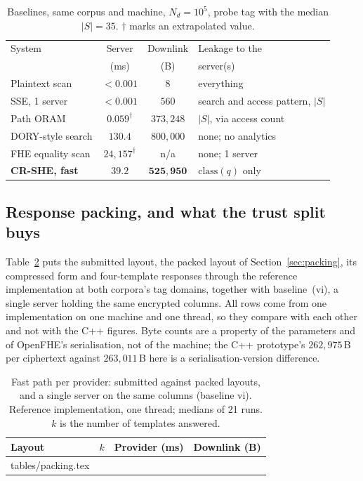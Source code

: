 \documentclass[a4paper,fleqn]{cas-dc}
\begin{document}
\begin{table}[pos=t]
\caption{Baselines, same corpus and machine, $N_d=10^5$, probe tag with the
median $|S|=35$. $\dagger$ marks an extrapolated value.}
\label{tab:baselines}
\centering
\footnotesize
\setlength{\tabcolsep}{3pt}
\renewcommand{\arraystretch}{1.2}
\begin{tabular}{@{}lcc>{\raggedright\arraybackslash}p{2.1cm}@{}}
\toprule
System & Server & Downlink & Leakage to the \\
       & (ms)   & (B)      & server(s) \\
\midrule
Plaintext scan        & $<0.001$ & $8$              & everything \\
SSE, 1 server         & $<0.001$ & $560$            & search and access
pattern, $|S|$ \\
Path ORAM             & $0.059^{\dagger}$ & $373{,}248$ & $|S|$, via access
count \\
DORY-style search     & $130.4$  & $800{,}000$      & none; no analytics \\
FHE equality scan     & $24{,}157^{\dagger}$ & n/a & none; 1 server \\
\midrule
\textbf{CR-SHE, fast} & $\mathbf{39.2}$ & $\mathbf{525{,}950}$ &
$\mathrm{class}(q)$ only \\
\bottomrule
\end{tabular}
\end{table}

\subsection{Response packing, and what the trust split buys}
\label{sec:packresult}
Table~\ref{tab:packing} puts the submitted layout, the packed layout of
Section~\ref{sec:packing}, its compressed form and four-template responses
through the reference implementation at both corpora's tag domains, together
with baseline~(vi), a single server holding the same encrypted columns. All
rows come from one implementation on one machine and one thread, so they
compare with each other and not with the C++ figures. Byte counts are a
property of the parameters and of OpenFHE's serialisation, not of the
machine; the C++ prototype's $262{,}975$\,B per ciphertext against
$263{,}011$\,B here is a serialisation-version difference.

\begin{table}[pos=t]
\caption{Fast path per provider: submitted against packed layouts, and a
single server on the same columns (baseline vi). Reference implementation,
one thread; medians of 21 runs. $k$ is the number of templates answered.}
\label{tab:packing}
\centering
\footnotesize
\setlength{\tabcolsep}{3pt}
\begin{tabular*}{\tblwidth}{@{\extracolsep{\fill}}lccc@{}}
\toprule
Layout & $k$ & Provider (ms) & Downlink (B) \\
\midrule
{} tables/packing.tex 
\end{tabular*}
\end{table}
\end{document}
